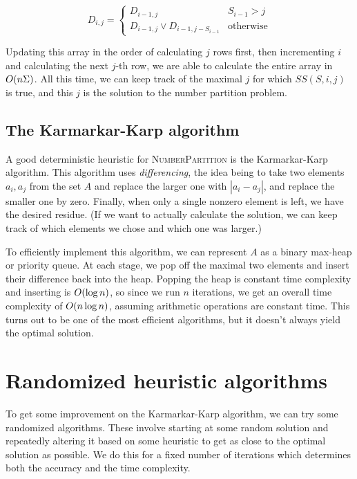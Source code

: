 \documentclass[a4paper, 10pt, twocolumn, twoside]{article}
\begin{document}
\[
    D_{i,j} = \begin{cases}
        D_{i-1, j} & S_{i-1}>j\\
        D_{i-1, j}\vee D_{i-1, j-S_{i-1}} & \textrm{otherwise}
    \end{cases}
\] 

Updating this array in the order of calculating $j$ rows first, then incrementing $i$ and calculating the next $j$-th row, we are able to calculate the entire array in $\mathop{\smash{O}}\nolimits(n\Sigma)$. All this time, we can keep track of the maximal $j$ for which $SS(S, i, j)$ is true, and this $j$ is the solution to the number partition problem.

\subsection{The Karmarkar-Karp algorithm}

A good deterministic heuristic for \textsc{NumberPartition} is the Karmarkar-Karp algorithm. This algorithm uses \emph{differencing}, the idea being to take two elements $a_i, a_j$ from the set $A$ and replace the larger one with $|a_i-a_j|$, and replace the smaller one by zero. Finally, when only a single nonzero element is left, we have the desired residue. (If we want to actually calculate the solution, we can keep track of which elements we chose and which one was larger.)

To efficiently implement this algorithm, we can represent $A$ as a binary max-heap or priority queue. At each stage, we pop off the maximal two elements and insert their difference back into the heap. Popping the heap is constant time complexity and inserting is $\mathop{\smash{O}}\nolimits(\log n)$, so since we run $n$ iterations, we get an overall time complexity of $\mathop{\smash{O}}\nolimits(n\log n)$, assuming arithmetic operations are constant time. This turns out to be one of the most efficient algorithms, but it doesn't always yield the optimal solution.

\section{Randomized heuristic algorithms}

To get some improvement on the Karmarkar-Karp algorithm, we can try some randomized algorithms. These involve starting at some random solution and repeatedly altering it based on some heuristic to get as close to the optimal solution as possible. We do this for a fixed number of iterations which determines both the accuracy and the time complexity. 
\end{document}
